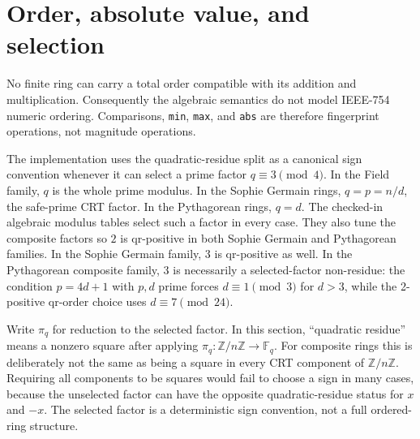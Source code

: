 \documentclass[11pt]{article}
\newcommand{\Z}{\mathbb{Z}}
\newcommand{\F}{\mathbb{F}}
\theoremstyle{plain}
\begin{document}
\section{Order, absolute value, and selection}
\label{sec:order-abs-selection}

No finite ring can carry a total order compatible with its addition and
multiplication.  Consequently the algebraic semantics do not model IEEE-754
numeric ordering.  Comparisons, \texttt{min}, \texttt{max}, and \texttt{abs}
are therefore fingerprint operations, not magnitude operations.

The implementation uses the quadratic-residue split as a canonical sign
convention whenever it can select a prime factor \(q\equiv3\pmod4\).  In the
Field family, \(q\) is the whole prime modulus.  In the Sophie Germain rings,
\(q=p=n/d\), the safe-prime CRT factor.  In the Pythagorean rings, \(q=d\).
The checked-in algebraic modulus tables select such a factor in every case.
They also tune the composite factors so \(2\) is qr-positive in both Sophie
Germain and Pythagorean families.  In the Sophie Germain family, \(3\) is
qr-positive as well.  In the Pythagorean composite family, \(3\) is necessarily
a selected-factor non-residue: the condition \(p=4d+1\) with \(p,d\) prime
forces \(d\equiv1\pmod3\) for \(d>3\), while the 2-positive qr-order choice
uses \(d\equiv7\pmod {24}\).

Write \(\pi_q\) for reduction to the selected factor.  In this section,
``quadratic residue'' means a nonzero square after applying
\(\pi_q\colon\Z/n\Z\to\F_q\).  For composite rings this is deliberately not the
same as being a square in every CRT component of \(\Z/n\Z\).  Requiring all
components to be squares would fail to choose a sign in many cases, because the
unselected factor can have the opposite quadratic-residue status for \(x\) and
\(-x\).  The selected factor is a deterministic sign convention, not a full
ordered-ring structure.
\end{document}
